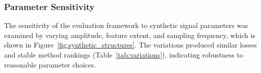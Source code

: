 \documentclass[iucr]{iucrjournals}
\begin{document}
\subsubsection{Parameter Sensitivity}


The sensitivity of the evaluation framework to synthetic signal parameters was examined by varying amplitude, feature extent, and sampling frequency, which is shown in Figure~\ref{fig:synthetic_structures}. The variations produced similar losses and stable method rankings (Table~\ref{tab:variations}), indicating robustness to reasonable parameter choices.

\end{document}
